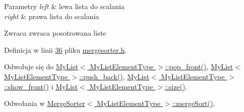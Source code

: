 \begin{DoxyParams}{Parametry}
{\em left} & lewa lista do scalania \\
\hline
{\em right} & prawa lista do scalania \\
\hline
\end{DoxyParams}
\begin{DoxyReturn}{Zwraca}
zwraca posotrowana liste 
\end{DoxyReturn}


Definicja w linii \hyperlink{mergesorter_8h_source_l00036}{36} pliku \hyperlink{mergesorter_8h_source}{mergesorter.\-h}.



Odwołuje się do \hyperlink{mylist_8h_source_l00098}{My\-List$<$ My\-List\-Element\-Type $>$\-::pop\-\_\-front()}, \hyperlink{mylist_8h_source_l00112}{My\-List$<$ My\-List\-Element\-Type $>$\-::push\-\_\-back()}, \hyperlink{mylist_8h_source_l00139}{My\-List$<$ My\-List\-Element\-Type $>$\-::show\-\_\-front()} i \hyperlink{mylist_8h_source_l00066}{My\-List$<$ My\-List\-Element\-Type $>$\-::size()}.



Odwołania w \hyperlink{mergesorter_8h_source_l00073}{Merge\-Sorter$<$ My\-List\-Element\-Type $>$\-::merge\-Sort()}.


